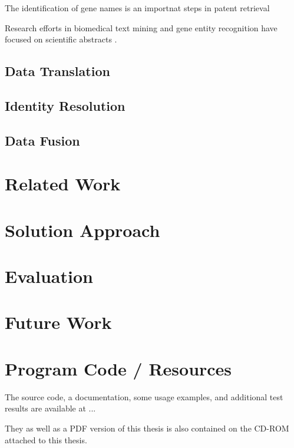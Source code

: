 \documentclass[11pt,titlepage,oneside,openany]{book}
\begin{document}
The identification of gene names is an importnat steps in patent retrieval

Research efforts in biomedical text mining and gene entity recognition have focused on scientific abstracts \cite{RodriguezEsteban2016TextMP}.

\section{Data Translation}

\section{Identity Resolution}

\section{Data Fusion}

\chapter{Related Work}

\chapter{Solution Approach}

\chapter{Evaluation}

\chapter{Future Work}






\appendix

\chapter{Program Code / Resources}
\label{cha:appendix-a}

The source code, a documentation, some usage examples, and additional test results are available at ...

They as well as a PDF version of this thesis is also contained on the CD-ROM attached to this thesis.
\end{document}
